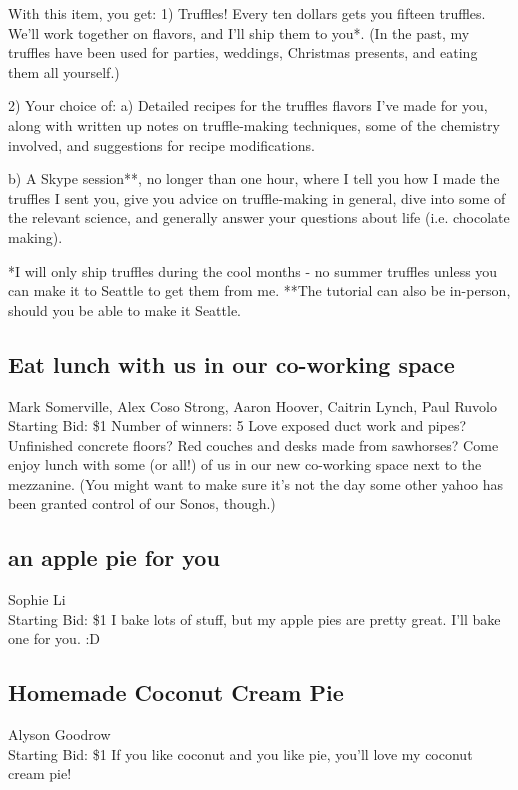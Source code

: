 \documentclass[11pt]{article}
\begin{document}
With this item, you get:
1) Truffles! Every ten dollars gets you fifteen truffles. We'll work together on flavors, and I'll ship them to you*. (In the past, my truffles have been used for parties, weddings, Christmas presents, and eating them all yourself.)

2) Your choice of:
    a) Detailed recipes for the truffles flavors I've made for you, along with written up notes on truffle-making techniques, some of the chemistry involved, and suggestions for recipe modifications.

    b) A Skype session**, no longer than one hour, where I tell you how I made the truffles I sent you, give you advice on truffle-making in general, dive into some of the relevant science, and generally answer your questions about life (i.e. chocolate making).

*I will only ship truffles during the cool months - no summer truffles unless you can make it to Seattle to get them from me.
**The tutorial can also be in-person, should you be able to make it Seattle.
\subsection{Eat lunch with us in our co-working space }
Mark Somerville, Alex Coso Strong, Aaron Hoover, Caitrin Lynch, Paul Ruvolo
\\
Starting Bid: \$1
\newline
Number of winners: 5
\newline
Love exposed duct work and pipes? Unfinished concrete floors? Red couches and desks made from sawhorses? Come enjoy lunch with some (or all!) of us in our new co-working space next to the mezzanine. (You might want to make sure it's not the day some other yahoo has been granted control of our Sonos, though.)
\subsection{an apple pie for you}
Sophie Li
\\
Starting Bid: \$1
\newline
I bake lots of stuff, but my apple pies are pretty great. I'll bake one for you. :D
\subsection{Homemade Coconut Cream Pie}
Alyson Goodrow
\\
Starting Bid: \$1
\newline
If you like coconut and you like pie, you'll love my coconut cream pie!
\end{document}
